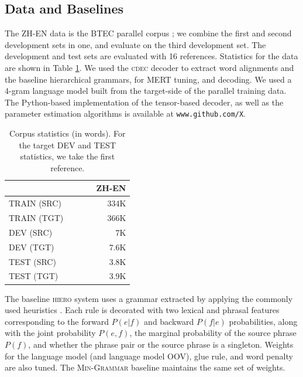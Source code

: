 \documentclass[11pt]{article}
\begin{document}
\subsection{Data and Baselines}
\label{sec:data}
The \textsc{ZH-EN} data is the BTEC parallel corpus \cite{Paul2009}; we combine the first and second development sets in one, and evaluate on the third development set.   
The development and test sets are evaluated with 16 references.  
Statistics for the data are shown in Table \ref{tab:corpusstats}.  
We used the \textsc{cdec} decoder \cite{Dyer2010} to extract word alignments and the baseline hierarchical grammars, for MERT tuning, and decoding.  
We used a 4-gram language model built from the target-side of the parallel training data. 
The Python-based implementation of the tensor-based decoder, as well as the parameter estimation algorithms is available at \texttt{www.github.com/X}.  
\begin{table}[h!]
  \begin{center}
    \begin{tabular}{p{0.5\linewidth}r}
      \hline
      & \textsc{ZH-EN} \\
	  \hline
      TRAIN (SRC)  & 334K \\
	  TRAIN (TGT)  &  366K \\
	  DEV (SRC)  & 7K \\
      DEV (TGT)  &  7.6K\\
	  TEST (SRC)  &  3.8K \\
	  TEST (TGT)  & 3.9K \\
	\end{tabular}
  \end{center}
  \caption{Corpus statistics (in words).  For the target DEV and TEST statistics, we take the first reference.}
  \label{tab:corpusstats}
\end{table}

The baseline \textsc{hiero} system uses a grammar extracted by applying the commonly used heuristics \cite{Chiang2007}.  
Each rule is decorated with two lexical and phrasal features corresponding to the forward $P(e|f)$ and backward $P(f|e)$ probabilities, along with the joint probability $P(e,f)$, the marginal probability of the source phrase $P(f)$, and whether the phrase pair or the source phrase is a singleton. 
Weights for the language model (and language model OOV), glue rule, and word penalty are also tuned. 
The \textsc{Min-Grammar} baseline maintains the same set of weights. 
\end{document}
